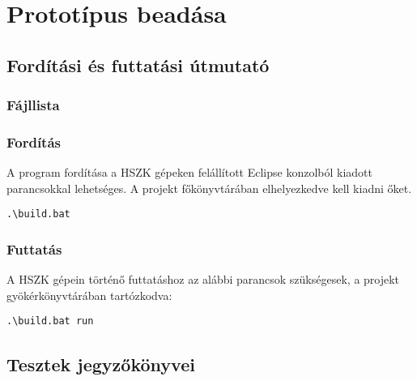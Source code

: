 %
\chapter{Prototípus beadása}

\thispagestyle{fancy}

\section{Fordítási és futtatási útmutató}

\subsection{Fájllista}


\subsection{Fordítás}
A program fordítása a HSZK gépeken felállított Eclipse konzolból kiadott parancsokkal lehetséges.
A projekt főkönyvtárában elhelyezkedve kell kiadni őket.

\lstset{escapeinside=`', xleftmargin=10pt, frame=single, basicstyle=\ttfamily\footnotesize, language=sh}
\begin{lstlisting}
.\build.bat
\end{lstlisting}

\subsection{Futtatás}
A HSZK gépein történő futtatáshoz az alábbi parancsok szükségesek, a projekt gyökérkönyvtárában tartózkodva:

\lstset{escapeinside=`', xleftmargin=10pt, frame=single, basicstyle=\ttfamily\footnotesize, language=sh}
\begin{lstlisting}
.\build.bat run
\end{lstlisting}

\section{Tesztek jegyzőkönyvei}

